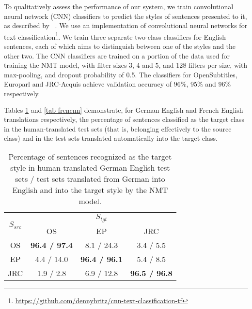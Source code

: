 \documentclass[11pt,a4paper]{article}
\begin{document}
To qualitatively assess the performance of our system, we train convolutional neural network (CNN) classifiers to predict the styles of sentences presented to it, as described by ~\citet{cnn-text-classification}. We use an implementation of convolutional neural networks for text classification\footnote{\url{https://github.com/dennybritz/cnn-text-classification-tf}}. We train three separate two-class classifiers for English sentences, each of which aims to distinguish between one of the styles and the other two. The CNN classifiers are trained on a portion of the data used for training the NMT model, with filter sizes 3, 4 and 5, and 128 filters per size, with max-pooling, and dropout probability of 0.5. The classifiers for OpenSubtitles, Europarl and JRC-Acquis achieve validation accuracy of 96\%, 95\% and 96\% respectively.

Tables \ref{tab-deencnn} and \ref{tab-frencnn} demonstrate, for German-English and French-English translations respectively, the percentage of sentences classified as the target class in the human-translated test sets (that is, belonging effectively to the source class) and in the test sets translated automatically into the target class.

\begin{table}[]
\begin{tabular}{|c|c|c|c|}
\hline
\multirow{2}{*}{$S_{src}$} & \multicolumn{3}{c|}{$S_{tgt}$}             \\ \cline{2-4} 
                        & OS          & EP          & JRC         \\ \hline
OS                      & \textbf{96.4 / 97.4} & 8.1 / 24.3  & 3.4 / 5.5   \\ \hline
EP                      & 4.4 / 14.0  & \textbf{96.4 / 96.1} & 5.4 / 8.5   \\ \hline
JRC                     & 1.9 / 2.8   & 6.9 / 12.8  & \textbf{96.5 / 96.8} \\ \hline
\end{tabular}
\caption{\small Percentage of sentences recognized as the target style in human-translated German-English test sets / test sets translated from German into English and into the target style by the NMT model.
      }
\label{tab-deencnn}
\end{table}
\end{document}
